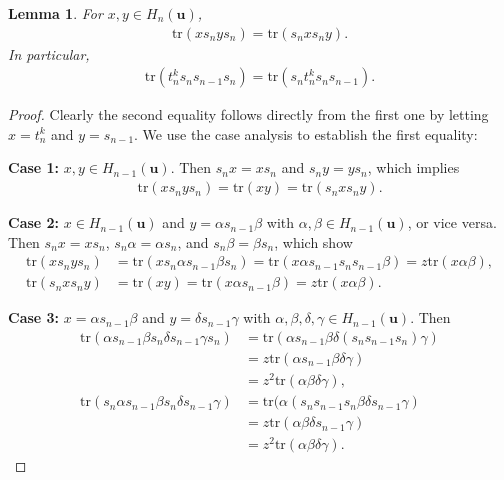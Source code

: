 \documentclass[a4paper, oneside]{amsart}
\numberwithin{equation}{section}
\newtheorem{lemma}[equation]{Lemma}
\theoremstyle{definition}
\theoremstyle{remark}
\begin{document}
\begin{lemma}\label{Lemm:xs_nys_n}For $x,y\in H_{n}(\boldsymbol{u})$,
\begin{align*}\mathrm{tr}(xs_nys_n)=\mathrm{tr}(s_nxs_ny).
  \end{align*}
In particular,  \begin{align*}
 \mathrm{tr}(t_n^ks_ns_{n-1}s_n)=\mathrm{tr}(s_nt_n^{k}s_ns_{n-1}).
  \end{align*}
 \end{lemma}
\begin{proof}Clearly the second equality follows directly from the first one by letting $x=t_n^k$ and $y=s_{n-1}$. We use the case analysis to establish the first equality:

\textbf{Case 1:} $x,y\in H_{n-1}(\boldsymbol{u})$. Then $s_nx=xs_n$ and $s_ny=ys_n$, which implies
\begin{align*}\mathrm{tr}(xs_nys_n)=\mathrm{tr}(xy)=\mathrm{tr}(s_nxs_ny).
  \end{align*}

  \textbf{Case 2:} $x\in H_{n-1}(\boldsymbol{u})$ and $y=\alpha s_{n-1}\beta$ with $\alpha,\beta\in H_{n-1}(\boldsymbol{u})$, or vice versa. Then $s_nx=xs_n$, $s_n\alpha=\alpha s_n$, and $s_n\beta=\beta s_n$, which show
  \begin{align*}
   \mathrm{tr}(xs_nys_n)&=\mathrm{tr}(xs_n\alpha s_{n-1}\beta s_n)=\mathrm{tr}(x \alpha s_{n-1}s_{n}s_{n-1}\beta)=z\mathrm{tr}(x\alpha\beta),\\
   \mathrm{tr}(s_nxs_ny)&=\mathrm{tr}(xy)=\mathrm{tr}(x\alpha s_{n-1}\beta)=z\mathrm{tr}(x\alpha\beta).
  \end{align*}

  \textbf{Case 3:} $x=\alpha s_{n-1}\beta$ and $y=\delta s_{n-1}\gamma$ with  $\alpha,\beta, \delta,\gamma\in H_{n-1}(\boldsymbol{u})$. Then
  \begin{align*}
   \mathrm{tr}(\alpha s_{n-1}\beta s_n \delta s_{n-1}\gamma s_n)&=\mathrm{tr}(\alpha s_{n-1}\beta  \delta (s_ns_{n-1}s_n)\gamma )\\&=z\mathrm{tr}(\alpha s_{n-1}\beta \delta\gamma)\\&=z^2\mathrm{tr}(\alpha\beta\delta\gamma),\\
   \mathrm{tr}(s_n\alpha s_{n-1}\beta s_n \delta s_{n-1}\gamma)&=\mathrm{tr}(\alpha (s_ns_{n-1}s_n\beta\delta s_{n-1}\gamma)\\&=z\mathrm{tr}(\alpha\beta\delta s_{n-1}\gamma)\\&=z^2\mathrm{tr}(\alpha\beta\delta \gamma).
  \end{align*}


\end{proof}
\end{document}
